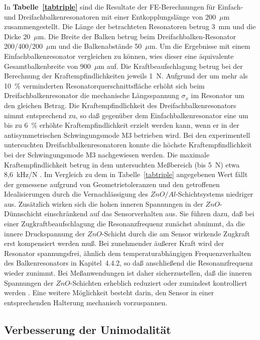 In {\bf Tabelle~\ref{tabtriple}} sind die Resultate der FE-Berechnungen für
Einfach- und Dreifachbalkenresonatoren mit einer Entkopplungslänge
von 200~$\mu$m zusammengestellt. Die Länge der betrachteten Resonatoren
betrug 3~mm und die Dicke 20~$\mu$m. Die Breite der Balken betrug
beim Dreifachbalken-Resonator 200/400/200~$\mu$m und die Balkenabstände
50~$\mu$m. Um die Ergebnisse mit einem Einfachbalkenresonator vergleichen
zu können, wies dieser eine äquivalente Gesamtbalkenbreite von 900~$\mu$m
auf. Die Kraftbeaufschlagung betrug bei der Berechnung der
Kraftempfindlichkeiten jeweils 1~N.
Aufgrund der um mehr als 10~\% verminderten Resonatorquerschnittsfläche
erhöht sich beim Dreifachbalkenresonator die mechanische Längsspannung
$\sigma_{x}$ im Resonator um den gleichen Betrag. Die Kraftempfindlichkeit
des Dreifachbalkenresonators nimmt entsprechend zu, so daß gegenüber dem
Einfachbalkenresonator eine um bis zu 6~\% erhöhte Kraftempfindlichkeit
erzielt werden kann, wenn er in der antisymmetrischen
Schwingungsmode M3 betrieben wird. Bei den experimentell untersuchten
Dreifachbalkenresonatoren konnte die höchste Kraftempfindlichkeit bei der
Schwingungsmode M3 nachgewiesen werden. Die maximale Kraftempfindlichkeit
betrug in dem untersuchten Meßbereich (bis 5~N) etwa 8,6~kHz/N
\cite{Fab93a}.
Im Vergleich zu dem in Tabelle~\ref{tabtriple} angegebenen Wert
fällt der gemessene aufgrund von Geometrietoleranzen und den
getroffenen Idealisierungen durch die Vernachlässigung des
$ZnO/Al$-Schichtsystems niedriger aus. Zusätzlich wirken sich die hohen
inneren Spannungen in der $ZnO$-Dünnschicht einschränkend auf das
Sensorverhalten aus. Sie führen dazu, daß bei einer Zugkraftbeaufschlagung
die Resonanzfrequenz zunächst abnimmt, da die innere Druckspannung der
$ZnO$-Schicht durch die am Sensor wirkende Zugkraft erst kompensiert
werden muß. Bei zunehmender äußerer Kraft wird der Resonator spannungsfrei,
ähnlich dem temperaturabhängigen Frequenzverhalten des Balkenresonators in
Kapitel~4.4.2, so daß anschließend die Resonanzfrequenz wieder zunimmt.
Bei Meßanwendungen ist daher sicherzustellen, daß die inneren Spannungen der
$ZnO$-Schichten erheblich reduziert oder zumindest kontrolliert werden
\cite{Sathe}. Eine weitere Möglichkeit besteht darin, den Sensor in einer
entsprechenden Halterung mechanisch vorzuspannen.



\subsection{Verbesserung der Unimodalität}
\label{unimodalitaet}

